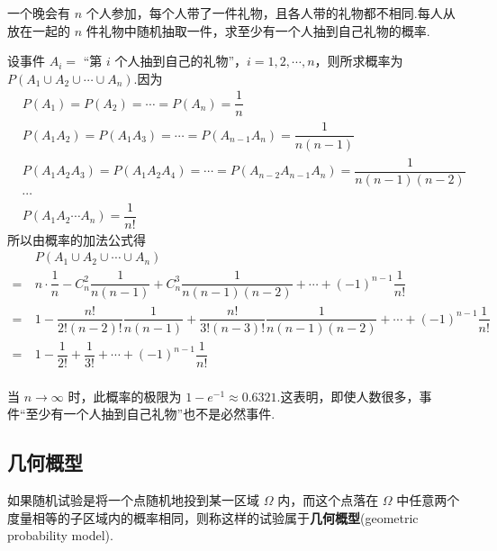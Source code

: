 \begin{example}[][配对问题]
    \indent 一个晚会有 $n$ 个人参加，每个人带了一件礼物，且各人带的礼物都不相同.每人从放在一起的 $n$ 件礼物中随机抽取一件，求至少有一个人抽到自己礼物的概率.
\end{example}

\begin{solution}
    设事件 $A_i=$ “第 $i$ 个人抽到自己的礼物”，$i=1,2,\cdots,n$，则所求概率为 $P(A_1 \cup A_2 \cup \cdots \cup A_n)$.因为
    $$
    \begin{aligned}
        & P(A_1) = P(A_2) = \cdots = P(A_n) = \dfrac{1}{n} \\
        & P(A_1 A_2) = P(A_1 A_3) = \cdots = P(A_{n-1} A_n) = \dfrac{1}{n(n-1)} \\
        & P(A_1 A_2 A_3) = P(A_1 A_2 A_4) = \cdots = P(A_{n-2} A_{n-1} A_n) = \dfrac{1}{n(n-1)(n-2)} \\
        & \cdots \\
        & P(A_1 A_2 \cdots A_n) = \dfrac{1}{n!}
    \end{aligned}
    $$
    所以由概率的加法公式得
    $$
    \begin{aligned}
        & P(A_1 \cup A_2 \cup \cdots \cup A_n) \\
        =\ & n \cdot \dfrac{1}{n} - C_n^2 \dfrac{1}{n(n-1)} + C_n^3 \dfrac{1}{n(n-1)(n-2)} + \cdots + (-1)^{n-1} \dfrac{1}{n!} \\
        =\ & 1 - \dfrac{n!}{2! (n-2)!} \dfrac{1}{n(n-1)} + \dfrac{n!}{3! (n-3)!} \dfrac{1}{n(n-1)(n-2)} + \cdots + (-1)^{n-1} \dfrac{1}{n!} \\
        =\ & 1 - \dfrac{1}{2!} + \dfrac{1}{3!} + \cdots + (-1)^{n-1} \dfrac{1}{n!} \\
    \end{aligned}
    $$
\end{solution}

\begin{note}
    \indent 当 $n \to \infty$ 时，此概率的极限为 $1 - e^{-1} \approx 0.6321$.这表明，即使人数很多，事件“至少有一个人抽到自己礼物”也不是必然事件.
\end{note}

\subsection{几何概型}

如果随机试验是将一个点随机地投到某一区域 $\varOmega$ 内，而这个点落在 $\varOmega$ 中任意两个度量相等的子区域内的概率相同，则称这样的试验属于\textbf{几何概型}(geometric probability model).


